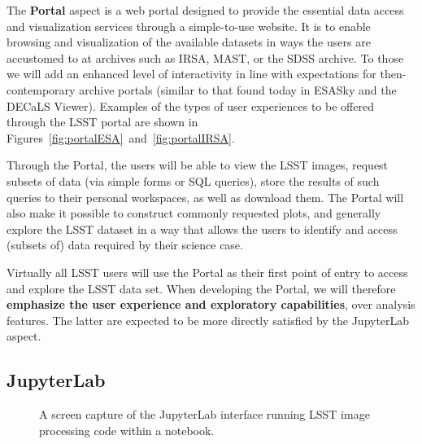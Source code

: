 The \textbf{Portal} aspect is a web portal designed to provide the essential data
access and visualization services through a simple-to-use website.  It is to
enable browsing and visualization of the available datasets in ways the
users are accustomed to at archives such as IRSA, MAST, or the SDSS archive.
To those we will add an enhanced level of interactivity in line with expectations for
then-contemporary archive portals (similar to that found today in ESASky and
the DECaLS Viewer). Examples of the types of user experiences to be offered
through the LSST portal are shown in Figures~\ref{fig:portalESA}~and~\ref{fig:portalIRSA}.

Through the Portal, the users will be
able to view the LSST images, request subsets of data (via simple forms or
SQL queries), store the results of such queries to their personal
workspaces, as well as download them. The Portal will also make it possible to
construct commonly requested plots, and generally explore the
LSST dataset in a way that allows the users to identify and access (subsets of)
data required by their science case.

Virtually all LSST users will use the Portal as their first point of entry to
access and explore the LSST data set. When developing the Portal,
we will therefore \textbf{emphasize the user experience and exploratory
capabilities}, over analysis features. The latter are expected to be more
directly satisfied by the JupyterLab aspect.

\subsection{JupyterLab\label{sec:jupyter}}

\begin{figure}
	\centering
	\caption{A screen capture of the JupyterLab interface running LSST image processing code within a notebook. \label{fig:JupyterLab}}
\end{figure}

